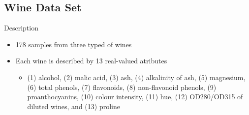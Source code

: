 \documentclass{beamer}
\begin{document}
\subsection{Wine Data Set}

\begin{frame}{Description}
	\begin{itemize}
		\item{178 samples from three typed of wines}
		\item{Each wine is described by 13 real-valued atributes}
		\begin{itemize}
			\item{(1) alcohol, (2) malic acid, (3) ash, (4) alkalinity of ash, (5) magnesium, (6) total phenols, (7) flavonoids, (8) non-flavonoid phenols, (9) proanthocyanins, (10) colour intensity, (11) hue, (12) OD280/OD315 of diluted wines, and (13) proline}
		\end{itemize}
	\end{itemize}
\end{frame}


%
%
\end{document}
